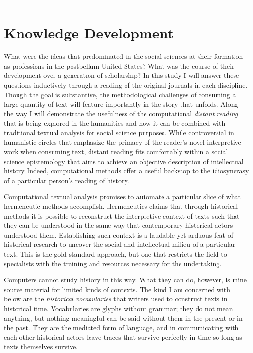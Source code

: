\documentclass[]{book}
\theoremstyle{definition}
\theoremstyle{definition}
\theoremstyle{definition}
\theoremstyle{remark}
\begin{document}
\begin{center}\rule{0.5\linewidth}{\linethickness}\end{center}

\hypertarget{kd}{%
\section{Knowledge Development}\label{kd}}

What were the ideas that predominated in the social sciences at their
formation as professions in the postbellum United States? What was the
course of their development over a generation of scholarship? In this
study I will answer these questions inductively through a reading of the
original journals in each discipline. Though the goal is substantive,
the methodological challenges of consuming a large quantity of text will
feature importantly in the story that unfolds. Along the way I will
demonstrate the usefulness of the computational \emph{distant reading}
that is being explored in the humanities and how it can be combined with
traditional textual analysis for social science purposes. While
controversial in humanistic circles that emphasize the primacy of the
reader's novel interpretive work when consuming text, distant reading
fits comfortably within a social science epistemology that aims to
achieve an objective description of intellectual history Indeed,
computational methods offer a useful backstop to the idiosyncrasy of a
particular person's reading of history.

Computational textual analysis promises to automate a particular slice
of what hermeneutic methods accomplish. Hermeneutics claims that through
historical methods it is possible to reconstruct the interpretive
context of texts such that they can be understood in the same way that
contemporary historical actors understood them. Establishing such
context is a laudable yet arduous feat of historical research to uncover
the social and intellectual milieu of a particular text. This is the
gold standard approach, but one that restricts the field to specialists
with the training and resources necessary for the undertaking.

Computers cannot study history in this way. What they can do, however,
is mine source material for limited kinds of contexts. The kind I am
concerned with below are the \emph{historical vocabularies} that writers
used to construct texts in historical time. Vocabularies are glyphs
without grammar; they do not mean anything, but nothing meaningful can
be said without them in the present or in the past. They are the
mediated form of language, and in communicating with each other
historical actors leave traces that survive perfectly in time so long as
texts themselves survive.
\end{document}
